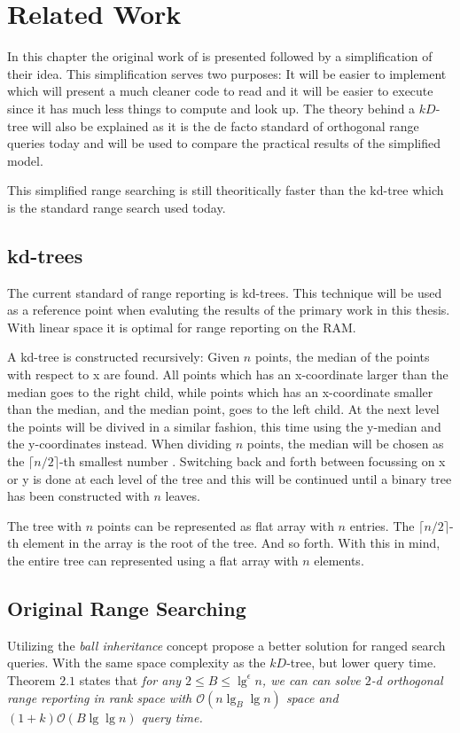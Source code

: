 \chapter{Related Work}
\label{ch:relatedwork}

In this chapter the original work of \citet{chanetal} is presented followed by a simplification of their idea. This simplification serves two purposes: It will be easier to implement which will present a much cleaner code to read and it will be easier to execute since it has much less things to compute and look up. The theory behind a $kD$-tree will also be explained as it is the de facto standard of orthogonal range queries today and will be used to compare the practical results of the simplified model.

This simplified range searching is still theoritically faster than the kd-tree which is the standard range search used today. 

\section{kd-trees}

The current standard of range reporting is kd-trees. This technique will be used as a reference point when evaluting the results of the primary work in this thesis. With linear space it is optimal for range reporting on the RAM.

A kd-tree is constructed recursively: Given $n$ points, the median of the points with respect to x are found. All points which has an x-coordinate larger than the median goes to the right child, while points which has an x-coordinate smaller than the median, and the median point, goes to the left child. At the next level the points will be divived in a similar fashion, this time using the y-median and the y-coordinates instead. When dividing $n$ points, the median will be chosen as the $\lceil n/2 \rceil$-th smallest number \cite{compgeo}.
Switching back and forth between focussing on x or y is done at each level of the tree and this will be continued until a binary tree has been constructed with $n$ leaves.

The tree with $n$ points can be represented as flat array with $n$ entries. The $\lceil n/2 \rceil$-th element in the array is the root of the tree. And so forth.
 With this in mind, the entire tree can represented using a flat array with $n$ elements. 




\section{Original Range Searching}
\label{sect:original}
Utilizing the \emph{ball inheritance} concept \citeauthor{chanetal} propose a better solution for ranged search queries. With the same space complexity as the $kD$-tree, but lower query time. Theorem $2.1$ states that \emph{for any $2 \leq B \leq \lg^\epsilon n$, we can can solve $2$-d orthogonal range reporting in rank space with $\mathcal{O}(n \lg_B \lg n)$ space and $(1+k)\mathcal{O}(B \lg \lg n)$ query time.}

